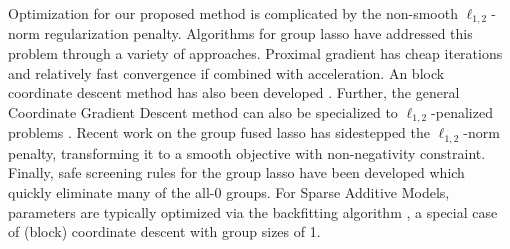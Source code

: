 Optimization for our proposed method is complicated by 
the non-smooth $\ell_{1,2}$-norm regularization penalty.
Algorithms for group lasso have addressed this problem 
through a variety of approaches.
Proximal gradient \citep{beck2009fast}
has cheap iterations and relatively fast convergence if combined with acceleration.
An block coordinate descent method has also been developed \citep{bcd-group-lasso:2013}.
Further, the general Coordinate Gradient Descent method \citep{cgd:2009} 
can also be specialized to $\ell_{1,2}$-penalized problems 
\citep{meier2008group,note-group-lasso:2010}.
Recent work \citep{group-fused-lasso:2014} on the group fused lasso 
has sidestepped the $\ell_{1,2}$-norm penalty, transforming it to a 
smooth objective with non-negativity constraint.
Finally, safe screening rules for the group lasso have been developed 
\citep{group-lasso-screening:2013} which quickly eliminate many of the all-0 
groups.
For Sparse Additive Models, parameters are typically 
optimized via the backfitting algorithm \citep{ravikumar09spam}, 
a special case of (block) coordinate descent with group sizes of 1.

